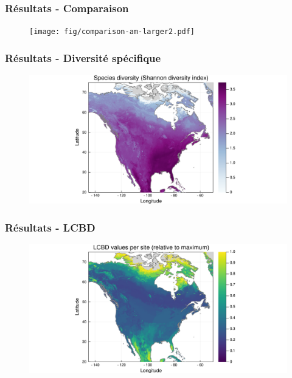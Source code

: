 \documentclass[10pt]{beamer}
\begin{document}
\begin{frame}
  \frametitle{Résultats - Comparaison}
  \begin{figure}
    \centering
    \texttt{[image: fig/comparison-am-larger2.pdf]}
  \end{figure}
\end{frame}

\begin{frame}
  \frametitle{Résultats - Diversité spécifique}
  \begin{figure}
    \centering
    \includegraphics[scale=0.4]{fig/diversity-am-larger2.pdf}
  \end{figure}
\end{frame}

\begin{frame}
  \frametitle{Résultats - LCBD}
  \begin{figure}
    \centering
    \includegraphics[scale=0.4]{fig/lcbd-am-larger2.pdf}
  \end{figure}
\end{frame}
\end{document}
